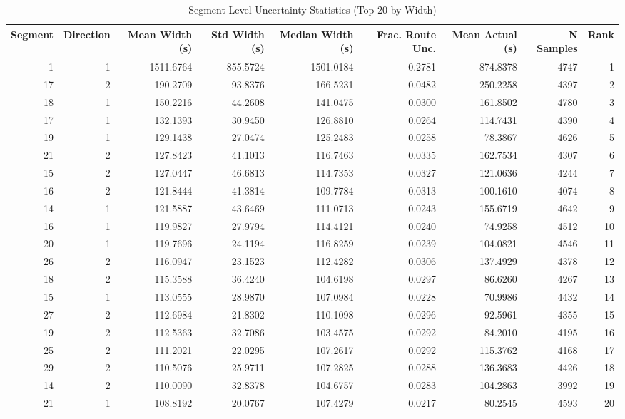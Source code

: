 \begin{table}
\caption{Segment-Level Uncertainty Statistics (Top 20 by Width)}
\label{tab:t62_segment_uncertainty}
\begin{tabular}{rrrrrrrrr}
\toprule
Segment & Direction & Mean Width (s) & Std Width (s) & Median Width (s) & Frac. Route Unc. & Mean Actual (s) & N Samples & Rank \\
\midrule
1 & 1 & 1511.6764 & 855.5724 & 1501.0184 & 0.2781 & 874.8378 & 4747 & 1 \\
17 & 2 & 190.2709 & 93.8376 & 166.5231 & 0.0482 & 250.2258 & 4397 & 2 \\
18 & 1 & 150.2216 & 44.2608 & 141.0475 & 0.0300 & 161.8502 & 4780 & 3 \\
17 & 1 & 132.1393 & 30.9450 & 126.8810 & 0.0264 & 114.7431 & 4390 & 4 \\
19 & 1 & 129.1438 & 27.0474 & 125.2483 & 0.0258 & 78.3867 & 4626 & 5 \\
21 & 2 & 127.8423 & 41.1013 & 116.7463 & 0.0335 & 162.7534 & 4307 & 6 \\
15 & 2 & 127.0447 & 46.6813 & 114.7353 & 0.0327 & 121.0636 & 4244 & 7 \\
16 & 2 & 121.8444 & 41.3814 & 109.7784 & 0.0313 & 100.1610 & 4074 & 8 \\
14 & 1 & 121.5887 & 43.6469 & 111.0713 & 0.0243 & 155.6719 & 4642 & 9 \\
16 & 1 & 119.9827 & 27.9794 & 114.4121 & 0.0240 & 74.9258 & 4512 & 10 \\
20 & 1 & 119.7696 & 24.1194 & 116.8259 & 0.0239 & 104.0821 & 4546 & 11 \\
26 & 2 & 116.0947 & 23.1523 & 112.4282 & 0.0306 & 137.4929 & 4378 & 12 \\
18 & 2 & 115.3588 & 36.4240 & 104.6198 & 0.0297 & 86.6260 & 4267 & 13 \\
15 & 1 & 113.0555 & 28.9870 & 107.0984 & 0.0228 & 70.9986 & 4432 & 14 \\
27 & 2 & 112.6984 & 21.8302 & 110.1098 & 0.0296 & 92.5961 & 4355 & 15 \\
19 & 2 & 112.5363 & 32.7086 & 103.4575 & 0.0292 & 84.2010 & 4195 & 16 \\
25 & 2 & 111.2021 & 22.0295 & 107.2617 & 0.0292 & 115.3762 & 4168 & 17 \\
29 & 2 & 110.5076 & 25.9711 & 107.2825 & 0.0288 & 136.3683 & 4426 & 18 \\
14 & 2 & 110.0090 & 32.8378 & 104.6757 & 0.0283 & 104.2863 & 3992 & 19 \\
21 & 1 & 108.8192 & 20.0767 & 107.4279 & 0.0217 & 80.2545 & 4593 & 20 \\
\bottomrule
\end{tabular}
\end{table}
